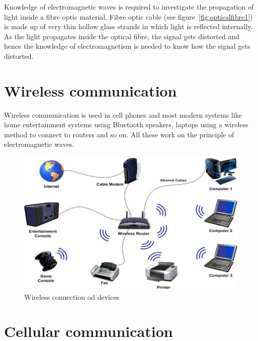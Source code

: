 Knowledge of electromagnetic waves is required to investigate the propagation of light inside a fibre optic material. Fibre optic cable (see figure~\ref{fig:opticalfibre1}) is made up of very thin hollow glass strands in which light is reflected internally. As the light propagates inside the optical fibre, the signal gets distorted and hence the knowledge of electromagnetism is needed to know how the signal gets distorted.

\section{Wireless communication}

Wireless communication is used in cell phones and most modern systems like home entertainment systems using Bluetooth speakers, laptops using a wireless method to connect to routers and so on. All these work on the principle of electromagnetic waves.
\begin{figure}[h]
\centering
\includegraphics[scale=0.3]{./graphics/Expert-support-for-wireless-communication-projects}
\caption{Wireless connection od devices}
\end{figure}
\section{Cellular communication} 

